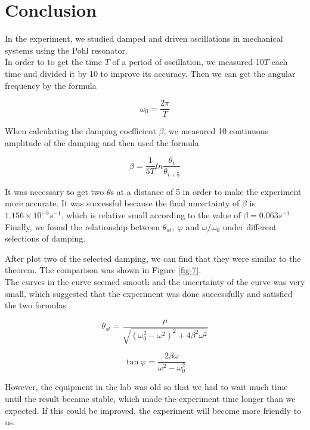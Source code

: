 \documentclass{article}
\begin{document}
\newpage
\section{Conclusion}

In the experiment, we studied damped and driven oscillations in mechanical systems using the Pohl resonator.
\\

In order to to get the time $T$  of a period of oscillation, we measured 10$T$ each time and divided it by 10 to improve its accuracy. Then we can get the angular frequency by the formula

$$\omega_0=\frac{2\pi}{T}$$

When calculating the damping coefficient $\beta$, we measured 10 continuous amplitude of the damping and then used the formula

$$\beta=\dfrac{1}{5T}ln\dfrac{\theta_i}{\theta_{i+5}}$$

It was necessary to get two $\theta$s at a distance of 5 in order to make the experiment more accurate. It was successful because the final uncertainty of $\beta$ is $1.156\times10^{-3}s^{-1}$, which is relative small according to the value of $\beta=0.063s^{-1}$
\\

Finally, we found the relationship between $\theta_{st},\ \varphi$ and $\omega/\omega_0$ under different selections of damping. 

After plot two of the selected damping, we can find that they were similar to the theorem. The comparison was shown in Figure \ref{fig-7}.
\\

The curves in the curve seemed smooth and the uncertainty of the curve was very small, which suggested that the experiment was done successfully and satisfied the two formulas

$$\theta_{st}=\frac{\mu}{\sqrt{(\omega_0^2-\omega^2)^2+4\beta^2\omega^2}}$$

$$\tan\varphi=\frac{2\beta\omega}{\omega^2-\omega_0^2}$$

However, the equipment in the lab was old so that we had to wait much time until the result became stable, which made the experiment time longer than we expected. If this could be improved, the experiment will become more friendly to us.
\end{document}
